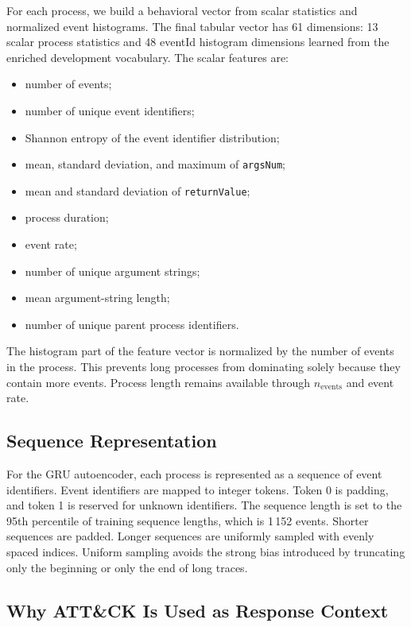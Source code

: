 \documentclass[10pt,journal,compsoc]{IEEEtran}
\begin{document}
For each process, we build a behavioral vector from scalar statistics and normalized event histograms. The final tabular vector has 61 dimensions: 13 scalar process statistics and 48 eventId histogram dimensions learned from the enriched development vocabulary. The scalar features are:
\begin{itemize}
    \item number of events;
    \item number of unique event identifiers;
    \item Shannon entropy of the event identifier distribution;
    \item mean, standard deviation, and maximum of \texttt{argsNum};
    \item mean and standard deviation of \texttt{returnValue};
    \item process duration;
    \item event rate;
    \item number of unique argument strings;
    \item mean argument-string length;
    \item number of unique parent process identifiers.
\end{itemize}

The histogram part of the feature vector is normalized by the number of events in the process. This prevents long processes from dominating solely because they contain more events. Process length remains available through $n_{\text{events}}$ and event rate.

\subsection{Sequence Representation}

For the GRU autoencoder, each process is represented as a sequence of event identifiers. Event identifiers are mapped to integer tokens. Token 0 is padding, and token 1 is reserved for unknown identifiers. The sequence length is set to the 95th percentile of training sequence lengths, which is 1\,152 events. Shorter sequences are padded. Longer sequences are uniformly sampled with evenly spaced indices. Uniform sampling avoids the strong bias introduced by truncating only the beginning or only the end of long traces.

\subsection{Why ATT\&CK Is Used as Response Context}
\end{document}
